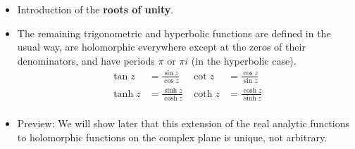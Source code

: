 \documentclass[../notes.tex]{subfiles}
\begin{document}
\begin{itemize}
    \item Introduction of the \textbf{roots of unity}.
    \item The remaining trigonometric and hyperbolic functions are defined in the usual way, are holomorphic everywhere except at the zeros of their denominators, and have periods $\pi$ or $\pi i$ (in the hyperbolic case).
    \begin{align*}
        \tan z &= \frac{\sin z}{\cos z}&
            \cot z &= \frac{\cos z}{\sin z}\\
        \tanh z &= \frac{\sinh z}{\cosh z}&
            \coth z &= \frac{\cosh z}{\sinh z}\\
    \end{align*}
    \item Preview: We will show later that this extension of the real analytic functions to holomorphic functions on the complex plane is unique, not arbitrary.
\end{itemize}
\end{document}
